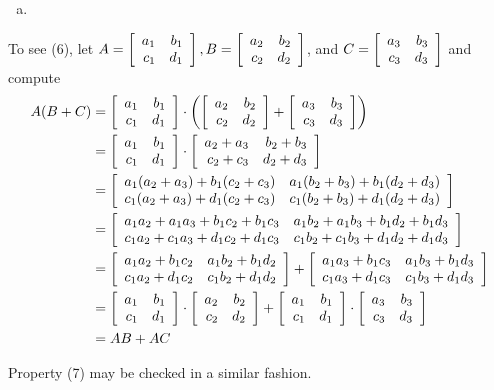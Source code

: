 \documentclass[11pt,fleqn,dvipsnames,usenames]{article}
\begin{document}
\begin{enumerate}[1.]
\begin{enumerate}[(a)]
\item 

\end{enumerate}

To see (6), let $A = \MATRIX{rr}{a_{1} & b_{1}\\c_{1} & d_{1}}, B = \MATRIX{rr}{a_{2} & b_{2}\\c_{2} & d_{2}}$, and $C = \MATRIX{rr}{a_{3} & b_{3}\\c_{3} & d_{3}}$ and compute
\begin{align*}
A(B+C) &= \MATRIX{rr}{a_{1} & b_{1}\\c_{1} & d_{1}} \cdot\left(\MATRIX{rr}{a_{2} & b_{2}\\c_{2} & d_{2}} + \MATRIX{rr}{a_{3} & b_{3}\\c_{3} & d_{3}}\right)\\
&= \MATRIX{rr}{a_{1} & b_{1}\\c_{1} & d_{1}} \cdot \MATRIX{rr}{a_{2} + a_{3} & b_{2} + b_{3}\\c_{2} + c_{3} & d_{2} + d_{3}}\\
&= \MATRIX{rr}{a_{1}(a_{2} + a_{3}) + b_{1}(c_{2} + c_{3}) & a_{1}(b_{2} + b_{3}) + b_{1}(d_{2} + d_{3})\\c_{1}(a_{2} + a_{3}) + d_{1}(c_{2} + c_{3}) & c_{1}(b_{2} + b_{3}) + d_{1}(d_{2} + d_{3})}\\
&= \MATRIX{rr}{a_{1}a_{2} + a_{1}a_{3} + b_{1}c_{2} + b_{1}c_{3} & a_{1}b_{2} + a_{1}b_{3} + b_{1}d_{2} + b_{1}d_{3}\\c_{1}a_{2} + c_{1}a_{3} + d_{1}c_{2} + d_{1}c_{3} & c_{1}b_{2} + c_{1}b_{3} + d_{1}d_{2} + d_{1}d_{3}}\\
&= \MATRIX{rr}{a_{1}a_{2} + b_{1}c_{2} & a_{1}b_{2} + b_{1}d_{2}\\c_{1}a_{2} + d_{1}c_{2} & c_{1}b_{2} + d_{1}d_{2}} + \MATRIX{rr}{a_{1}a_{3} +  b_{1}c_{3} & a_{1}b_{3} + b_{1}d_{3}\\c_{1}a_{3} + d_{1}c_{3} & c_{1}b_{3} + d_{1}d_{3}}\\
&= \MATRIX{rr}{a_{1} & b_{1}\\c_{1} & d_{1}}\cdot \MATRIX{rr}{a_{2} & b_{2}\\c_{2} & d_{2}} + \MATRIX{rr}{a_{1} & b_{1}\\c_{1} & d_{1}}\cdot \MATRIX{rr}{a_{3} & b_{3}\\c_{3} & d_{3}}\\
&= AB + AC
\end{align*}

Property (7) may be checked in a similar fashion.


\end{enumerate}
\end{document}
